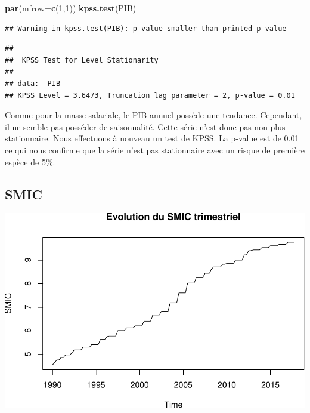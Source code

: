 \documentclass[11pt,]{article}
\newenvironment{Shaded}{\begin{snugshade}}{\end{snugshade}}
\newcommand{\KeywordTok}[1]{\textcolor[rgb]{0.13,0.29,0.53}{\textbf{{#1}}}}
\newcommand{\DataTypeTok}[1]{\textcolor[rgb]{0.13,0.29,0.53}{{#1}}}
\newcommand{\DecValTok}[1]{\textcolor[rgb]{0.00,0.00,0.81}{{#1}}}
\newcommand{\StringTok}[1]{\textcolor[rgb]{0.31,0.60,0.02}{{#1}}}
\newcommand{\NormalTok}[1]{{#1}}
\begin{document}
\begin{Shaded}
\begin{Highlighting}[]
  \KeywordTok{par}\NormalTok{(}\DataTypeTok{mfrow=}\KeywordTok{c}\NormalTok{(}\DecValTok{1}\NormalTok{,}\DecValTok{1}\NormalTok{))}
  \KeywordTok{kpss.test}\NormalTok{(PIB)}
\end{Highlighting}
\end{Shaded}

\begin{verbatim}
## Warning in kpss.test(PIB): p-value smaller than printed p-value
\end{verbatim}

\begin{verbatim}
## 
##  KPSS Test for Level Stationarity
## 
## data:  PIB
## KPSS Level = 3.6473, Truncation lag parameter = 2, p-value = 0.01
\end{verbatim}

Comme pour la masse salariale, le PIB annuel possède une tendance.
Cependant, il ne semble pas posséder de saisonnalité. Cette série n'est
donc pas non plus stationnaire. Nous effectuons à nouveau un test de
KPSS. La p-value est de 0.01 ce qui nous confirme que la série n'est pas
stationnaire avec un risque de première espèce de 5\%.

\subsection{SMIC}\label{smic}

\begin{Shaded}
\end{Shaded}

\includegraphics{doc_files/figure-latex/unnamed-chunk-4-1.pdf}
\end{document}
